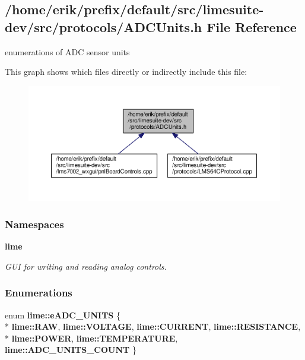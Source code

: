 \subsection{/home/erik/prefix/default/src/limesuite-\/dev/src/protocols/\+A\+D\+C\+Units.h File Reference}
\label{ADCUnits_8h}


enumerations of A\+DC sensor units  


This graph shows which files directly or indirectly include this file\+:
\nopagebreak
\begin{figure}[H]
\begin{center}
\leavevmode
\includegraphics[width=350pt]{d3/dab/ADCUnits_8h__dep__incl}
\end{center}
\end{figure}
\subsubsection*{Namespaces}
\begin{DoxyCompactItemize}
\item 
 {\bf lime}
\begin{DoxyCompactList}\small\item\em G\+UI for writing and reading analog controls. \end{DoxyCompactList}\end{DoxyCompactItemize}
\subsubsection*{Enumerations}
\begin{DoxyCompactItemize}
\item 
enum {\bf lime\+::e\+A\+D\+C\+\_\+\+U\+N\+I\+TS} \{ \\*
{\bf lime\+::\+R\+AW}, 
{\bf lime\+::\+V\+O\+L\+T\+A\+GE}, 
{\bf lime\+::\+C\+U\+R\+R\+E\+NT}, 
{\bf lime\+::\+R\+E\+S\+I\+S\+T\+A\+N\+CE}, 
\\*
{\bf lime\+::\+P\+O\+W\+ER}, 
{\bf lime\+::\+T\+E\+M\+P\+E\+R\+A\+T\+U\+RE}, 
{\bf lime\+::\+A\+D\+C\+\_\+\+U\+N\+I\+T\+S\+\_\+\+C\+O\+U\+NT}
 \}
\end{DoxyCompactItemize}
